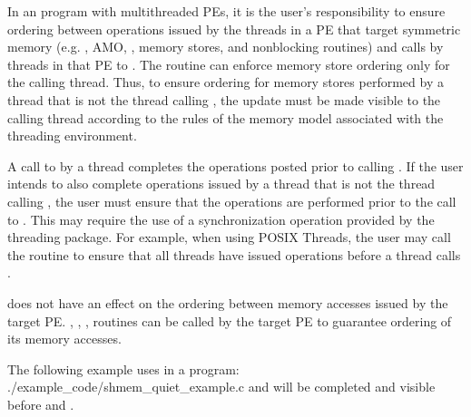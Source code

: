 \begin{apidefinition}
{    In an \openshmem program with multithreaded \acp{PE}, it is the
    user's responsibility to ensure ordering between operations issued by the threads
    in a \ac{PE} that target symmetric memory (e.g. \PUT{}, \ac{AMO}, , memory stores,
    and nonblocking routines) and calls by threads in that \ac{PE} to
    . The  routine can enforce memory store ordering only for the
    calling thread. Thus, to ensure ordering for memory stores performed by a thread that is
    not the thread calling , the update must be made visible to the
    calling thread according to the rules of the memory model associated with
    the threading environment.

     A call to  by a thread completes the operations posted prior
     to calling . If the user intends to also complete operations
     issued by a thread that is not the thread calling , the
     user must ensure that the operations are performed prior to the call to
     . This may require the use of a synchronization
     operation provided by the threading package. For example, when using POSIX
     Threads, the user may call the  routine to
     ensure that all threads have issued operations before a thread calls
     .

     does not have an effect on the ordering between memory
    accesses issued by the target PE. ,
    , ,  routines
    can be called by the target PE to guarantee ordering of its memory accesses.
}

\begin{apiexamples}

\apicexample
    {The following example uses  in a \Cstd[11] program: }
    {./example_code/shmem_quiet_example.c}
    { and  will be completed and visible before 
    and .}
\end{apiexamples}

\end{apidefinition}
